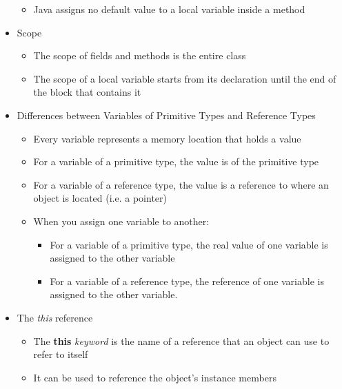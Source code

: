 \documentclass[11pt]{article}
\begin{document}
\begin{itemize}
\begin{itemize}
			\item Java assigns no default value to a local variable inside a method
		\end{itemize}

	\item Scope
		\begin{itemize}
			\item The scope of fields and methods is the entire class
			\item The scope of a local variable starts from its declaration until the end
			of the block that contains it
		\end{itemize}

	\item Differences between Variables of Primitive Types and Reference Types
		\begin{itemize}
			\item Every variable represents a memory location that holds a value
			\item For a variable of a primitive type, the value is of the primitive type
			\item For a variable of a reference type, the value is a reference to where an object is located (i.e. a pointer)
			\item When you assign one variable to another:
				\begin{itemize}
					\item For a variable of a primitive type, the real value of one variable is assigned to
					the other variable
					\item For a variable of a reference type, the reference of one variable is assigned to the other variable.
				\end{itemize}
		\end{itemize}

	\item The \textit{this} reference
		\begin{itemize}
			\item The \textbf{this} \textit{keyword} is the name of a reference that an object can use to
			refer to itself
			\item It can be used to reference the object’s instance members
		\end{itemize}


\end{itemize}
\end{document}
